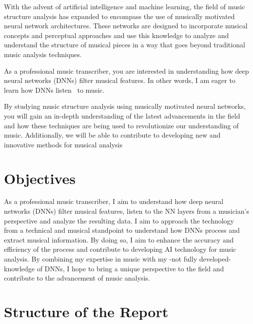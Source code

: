 With the advent of artificial intelligence and machine learning, the field of music structure analysis has expanded to encompass the use of musically motivated neural network architectures. These networks are designed to incorporate musical concepts and perceptual approaches and use this knowledge to analyze and understand the structure of musical pieces in a way that goes beyond traditional music analysis techniques.

As a professional music transcriber, you are interested in understanding how deep neural networks (DNNs) filter musical features. In other words, I am eager to learn how DNNs listen~\cite{7500246} to music.

By studying music structure analysis using musically motivated neural networks, you will gain an in-depth understanding of the latest advancements in the field and how these techniques are being used to revolutionize our understanding of music. Additionally, we will be able to contribute to developing new and innovative methods for musical analysis~\cite{Huang2019MusicTG}

\section{Objectives}

As a professional music transcriber, I aim to understand how deep neural networks (DNNs) filter musical features, listen to the NN layers from a musician's perspective and analyze the resulting data. I aim to approach the technology from a technical and musical standpoint to understand how DNNs process and extract musical information. By doing so, I aim to enhance the accuracy and efficiency of the process and contribute to developing AI technology for music analysis. By combining my expertise in music with my -not fully developed- knowledge of DNNs, I hope to bring a unique perspective to the field and contribute to the advancement of music analysis.

\section{Structure of the Report}


\newpage


